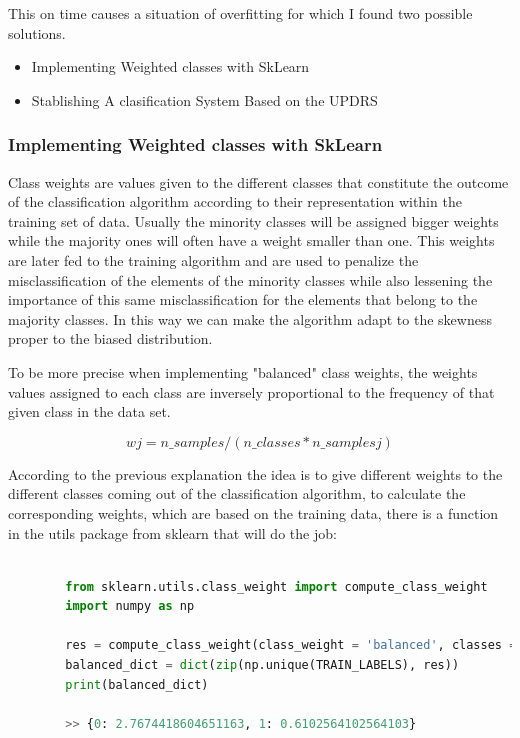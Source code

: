 \documentclass[12pt, a4paper]{article}
\begin{document}
	This on time causes a situation of overfitting for which I found two possible solutions.
	
	\begin{itemize}
		
		\item Implementing Weighted classes with SkLearn
		
		\item Stablishing A clasification System Based on the UPDRS
		
	\end{itemize}
	
	\clearpage
	
	\subsubsection{Implementing Weighted classes with SkLearn}
	
	
	Class weights are values given to the different classes that constitute the outcome of the classification algorithm according to their representation within the training set of data. Usually the minority classes will be assigned bigger weights while the majority ones will often have a weight smaller than one. This weights are later fed to the training algorithm and are used to penalize the misclassification of the elements of the minority classes while also lessening the importance of this same misclassification for the elements that belong to the majority classes. In this way we can make the algorithm adapt to the skewness proper to the biased distribution.
	
	To be more precise when implementing "balanced" class weights, the weights values assigned to each class are inversely proportional to the frequency of that given class in the data set.\cite{classWeights}
	
	\[ wj = n\_samples / (n\_classes * n\_samplesj) \] 
	
	According to the previous explanation the idea is to give different weights to the different classes coming out of the classification algorithm, to calculate the corresponding weights, which are based on the training data, there is a function in the utils package from sklearn that will do the job:
	
	\vspace{5mm}
	
	\begin{lstlisting}[language=Python]
			
		from sklearn.utils.class_weight import compute_class_weight
		import numpy as np
		
		res = compute_class_weight(class_weight = 'balanced', classes = np.unique(TRAIN_LABELS), y = TRAIN_LABELS);
		balanced_dict = dict(zip(np.unique(TRAIN_LABELS), res))
		print(balanced_dict)
		
		>> {0: 2.7674418604651163, 1: 0.6102564102564103}
	
	\end{lstlisting}
\end{document}
